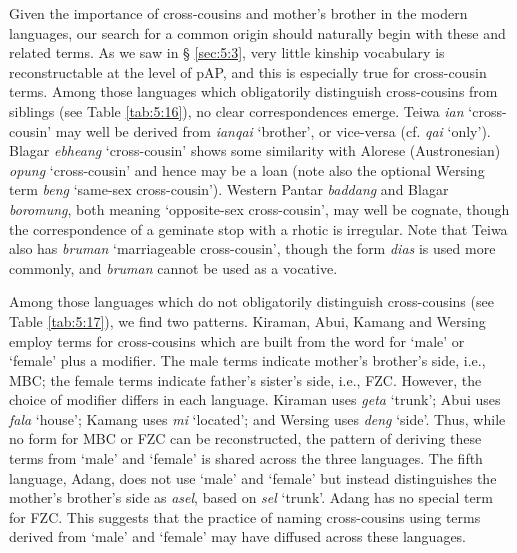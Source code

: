Given the importance of cross-cousins and mother's brother in the modern languages, our search for a common origin should naturally begin with these and related terms. As we saw in {\S} \ref{sec:5:3}, very little kinship vocabulary is reconstructable at the level of pAP, and this is especially true for cross-cousin terms. Among those languages which obligatorily distinguish cross-cousins from siblings (see Table \ref{tab:5:16}), no clear correspondences emerge. Teiwa \textit{ian} `cross-cousin' may well be derived from \textit{ianqai} `brother', or vice-versa (cf. \textit{qai} `only'). Blagar \textit{ebheang} `cross-cousin' shows some similarity with Alorese (Austronesian) \textit{opung} `cross-cousin' and hence may be a loan (note also the optional Wersing term \textit{beng} `same-sex cross-cousin'). Western Pantar \textit{baddang} and Blagar \textit{boromung}, both meaning `opposite-sex cross-cousin', may well be cognate, though the correspondence of a geminate stop with a rhotic is irregular. Note that Teiwa also has \textit{bruman} `marriageable cross-cousin', though the form \textit{dias} is used more commonly, and \textit{bruman} cannot be used as a vocative.  

Among those languages which do not obligatorily distinguish cross-cousins (see Table \ref{tab:5:17}), we find two patterns. Kiraman, Abui, Kamang and Wersing employ terms for cross-cousins which are built from the word for `male' or `female' plus a modifier. The male terms indicate mother's brother's side, i.e., MBC; the female terms indicate father's sister's side, i.e., FZC. However, the choice of modifier differs in each language. Kiraman uses \textit{geta} `trunk'; Abui uses \textit{fala} `house'; Kamang uses \textit{mi} `located'; and Wersing uses \textit{deng} `side'. Thus, while no form for MBC or FZC can be reconstructed, the pattern of deriving these terms from `male' and `female' is shared across the three languages. The fifth language, Adang, does not use `male' and `female' but instead distinguishes the mother's brother's side as \textit{asel}, based on \textit{sel} `trunk'. Adang has no special term for FZC. This suggests that the practice of naming cross-cousins using terms derived from `male' and `female' may have diffused across these languages.

